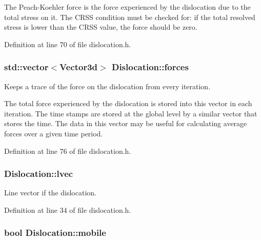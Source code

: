 The Peach-\/\-Koehler force is the force experienced by the dislocation due to the total stress on it. The C\-R\-S\-S condition must be checked for\-: if the total resolved stress is lower than the C\-R\-S\-S value, the force should be zero. 

Definition at line 70 of file dislocation.\-h.

\hypertarget{classDislocation_aa8f4567bbfc6a58aaad01d5c423658c1}{
\subsubsection[{forces}]{\setlength{\rightskip}{0pt plus 5cm}std\-::vector$<${\bf Vector3d}$>$ Dislocation\-::forces\hspace{0.3cm}{\ttfamily [protected]}}}\label{d3/dc6/classDislocation_aa8f4567bbfc6a58aaad01d5c423658c1}


Keeps a trace of the force on the dislocation from every iteration. 

The total force experienced by the dislocation is stored into this vector in each iteration. The time stamps are stored at the global level by a similar vector that stores the time. The data in this vector may be useful for calculating average forces over a given time period. 

Definition at line 76 of file dislocation.\-h.

\hypertarget{classDislocation_a69d16092777d9ead2d4eedf7c3d47877}{
\subsubsection[{lvec}]{ Dislocation\-::lvec\hspace{0.3cm}{\ttfamily [protected]}}}\label{d3/dc6/classDislocation_a69d16092777d9ead2d4eedf7c3d47877}


Line vector if the dislocation. 



Definition at line 34 of file dislocation.\-h.

\hypertarget{classDislocation_a62c80daa260a3301baf1dceaab5d23d0}{
\subsubsection[{mobile}]{\setlength{\rightskip}{0pt plus 5cm}bool Dislocation\-::mobile\hspace{0.3cm}{\ttfamily [protected]}}}\label{d3/dc6/classDislocation_a62c80daa260a3301baf1dceaab5d23d0}


